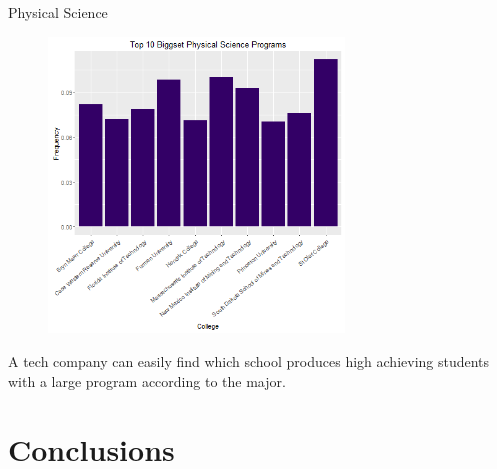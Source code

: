 \documentclass{article}
\begin{document}
Physical Science 
\begin{figure}[H]
\includegraphics[width=0.7\textwidth]{../images/biggestPhysical.png}
\end{figure}


A tech company can easily find which school produces high achieving students with a large program according to the major. 

\section{Conclusions}
\end{document}
